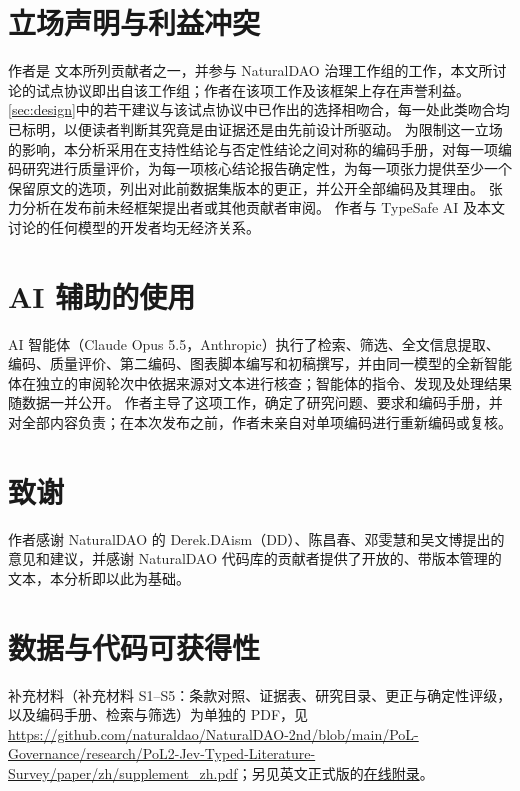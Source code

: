 \section*{立场声明与利益冲突}
\label{sec:statements}
作者是 \pol{} 文本所列贡献者之一，并参与 NaturalDAO 治理工作组的工作，本文所讨论的试点协议即出自该工作组；作者在该项工作及该框架上存在声誉利益。
\cref{sec:design}中的若干建议与该试点协议中已作出的选择相吻合，每一处此类吻合均已标明，以便读者判断其究竟是由证据还是由先前设计所驱动。
为限制这一立场的影响，本分析采用在支持性结论与否定性结论之间对称的编码手册，对每一项编码研究进行质量评价，为每一项核心结论报告确定性，为每一项张力提供至少一个保留原文的选项，列出对此前数据集版本的更正，并公开全部编码及其理由。
张力分析在发布前未经框架提出者或其他贡献者审阅。
作者与 TypeSafe AI 及本文讨论的任何模型的开发者均无经济关系。

\section*{AI 辅助的使用}
AI 智能体（Claude Opus 5.5，Anthropic）执行了检索、筛选、全文信息提取、编码、质量评价、第二编码、图表脚本编写和初稿撰写，并由同一模型的全新智能体在独立的审阅轮次中依据来源对文本进行核查；智能体的指令、发现及处理结果随数据一并公开。
作者主导了这项工作，确定了研究问题、要求和编码手册，并对全部内容负责；在本次发布之前，作者未亲自对单项编码进行重新编码或复核。

\section*{致谢}
作者感谢 NaturalDAO 的 Derek.DAism（DD）、陈昌春、邓雯慧和吴文博提出的意见和建议，并感谢 NaturalDAO 代码库的贡献者提供了开放的、带版本管理的 \pol{} 文本，本分析即以此为基础。

\section*{数据与代码可获得性}
补充材料（补充材料 S1--S5：条款对照、证据表、研究目录、更正与确定性评级，以及编码手册、检索与筛选）为单独的 PDF，见 \url{https://github.com/naturaldao/NaturalDAO-2nd/blob/main/PoL-Governance/research/PoL2-Jev-Typed-Literature-Survey/paper/zh/supplement_zh.pdf}；另见英文正式版的\href{https://github.com/naturaldao/NaturalDAO-2nd/blob/main/PoL-Governance/research/PoL2-Jev-Typed-Literature-Survey/paper/online_appendix.pdf}{在线附录}。


